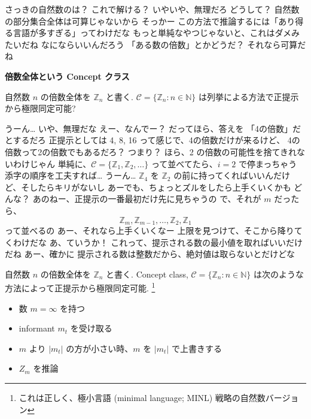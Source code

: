 \YUKARI さっきの自然数のは？ これで解ける？
\YUI いやいや、無理だろ
\YUKARI どうして？
\YUI 自然数の部分集合全体は可算じゃないから
\YUKARI そっかー
\YUI この方法で推論するには「あり得る言語が多すぎる」ってわけだな
\YUZUKO もっと単純なやつじゃないと、これはダメみたいだね
\YUKARI なにならいいんだろう
\YUI 「ある数の倍数」とかどうだ？
\YUKARI それなら可算だね

\begin{boxnote}
    {\bf 倍数全体という Concept クラス}

    自然数 $n$ の倍数全体を $\mathbb{Z}_n$ と書く.
    $\mathcal{C} = \{ \mathbb{Z}_n : n \in \mathbb{N} \}$ は列挙による方法で正提示から極限同定可能?
\end{boxnote}

\YUZUKO うーん…
\YUI いや、無理だな
\YUKARI えー、なんでー？
\YUI だってほら、答えを 「4の倍数」だとするだろ
\YUI 正提示としては 4, 8, 16 って感じで、4の倍数だけが来るけど、
\YUI 4の倍数って2の倍数でもあるだろ？
\YUKARI つまり？
\YUZUKO ほら、2 の倍数の可能性を捨てきれないわけじゃん
\YUI 単純に、$\mathcal{C} = \{ \mathbb{Z}_1, \mathbb{Z}_2, \ldots \}$ って並べてたら、$i=2$ で停まっちゃう
\YUZUKO 添字の順序を工夫すれば… うーん…
\YUI $\mathbb{Z}_4$ を $\mathbb{Z}_2$ の前に持ってくればいいんだけど、そしたらキリがないし
\YUKARI あーでも、ちょっとズルをしたら上手くいくかも
\YUI どんな？
\YUKARI あのねー、正提示の一番最初だけ先に見ちゃうの
\YUKARI で、それが $m$ だったら、
$$\mathbb{Z}_{m}, \mathbb{Z}_{m-1}, \ldots, \mathbb{Z}_{2}, \mathbb{Z}_{1}$$\vspace{-6mm}
\YUKARI って並べるの
\YUI あー、それなら上手くいくなー
\YUI 上限を見つけて、そこから降りてくわけだな
\YUZUKO あ、ていうか！
\YUZUKO これって、提示される数の最小値を取ればいいだけだね
\YUKARI あー、確かに
\YUI 提示される数は整数だから、絶対値は取らないとだけどな

\begin{boxnote}
    自然数 $n$ の倍数全体を $\mathbb{Z}_n$ と書く.
    Concept class, $\mathcal{C} = \{ \mathbb{Z}_n : n \in \mathbb{N} \}$ は次のような方法によって正提示から極限同定可能.  \footnote{これは正しく、極小言語 (minimal language; MINL) 戦略の自然数バージョン}
    \begin{itemize}
        \setlength{\itemsep}{-1mm}
        \item 数 $m = \infty$ を持つ
        \item informant $m_t$ を受け取る
        \item $m$ より $|m_t|$ の方が小さい時、$m$ を $|m_t|$ で上書きする
        \item $Z_m$ を推論
    \end{itemize}
\end{boxnote}

